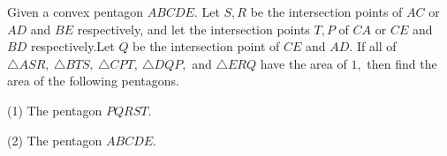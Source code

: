 Given a convex pentagon $ABCDE.$ Let $S,R$ be the intersection points of $AC$ or $AD$ and $BE$ respectively, and let the intersection points $T,P$ of $CA$ or $CE$ and $BD$ respectively.Let $Q$ be the intersection point of $CE$ and $AD.$ If all of $\triangle{ASR},\ \triangle{BTS},\ \triangle{CPT},\ \triangle{DQP},$ and $\triangle{ERQ}$ have the area of $1,$ then find the area of the following pentagons.

(1) The pentagon $PQRST.$

(2) The pentagon $ABCDE.$